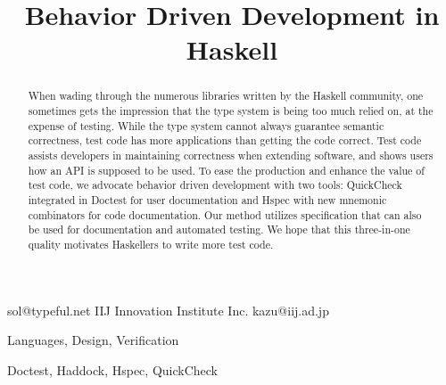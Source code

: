 \documentclass[preprint]{sigplanconf}
\begin{document}
\copyrightdata{[to be supplied]}


\title{Behavior Driven Development in Haskell}

           {}
           {sol@typeful.net}
           {IIJ Innovation Institute Inc.}
           {kazu@iij.ad.jp}

\maketitle

\begin{abstract}

When wading through the numerous libraries written by
the Haskell community, one sometimes gets the impression that the type
system is being too much relied on, at the expense of testing.
While the type system cannot always guarantee semantic correctness,
test code has more applications than getting the code correct.
Test code assists developers in maintaining correctness when extending
software, and shows users how an API is supposed to be used.
To ease the production and enhance the value of test code, we advocate
behavior driven development with two tools:
QuickCheck integrated in Doctest for user documentation and Hspec
with new mnemonic combinators for code documentation.
Our method utilizes specification that can also be used for
documentation and automated testing. We hope that this three-in-one
quality motivates Haskellers to write more test code.


\end{abstract}


\terms Languages, Design, Verification

\keywords Doctest, Haddock, Hspec, QuickCheck

\end{document}
